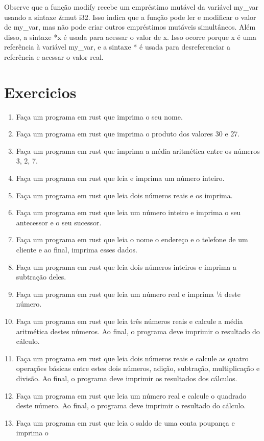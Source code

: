 \documentclass[12pt,a4paper,oneside]{abntex2}
\begin{document}
Observe que a função modify recebe um empréstimo mutável da variável my\_var usando a sintaxe \&mut i32. Isso indica que a função pode ler e modificar o valor de my\_var, mas não pode criar outros empréstimos mutáveis simultâneos. Além disso, a sintaxe *x é usada para acessar o valor de x. Isso ocorre porque x é uma referência à variável my\_var, e a sintaxe * é usada para desreferenciar a referência e acessar o valor real.

\section{Exercicios}
\begin{enumerate}
    \item Faça um programa em rust que imprima o seu nome.
    \item Faça um programa em rust que imprima o produto dos valores 30 e 27.
\item Faça um programa em rust que imprima a média aritmética entre os números 3, 2,
7.
\item Faça um programa em rust que leia e imprima um número inteiro.
\item Faça um programa em rust que leia dois números reais e os imprima.
\item Faça um programa em rust que leia um número inteiro e imprima o seu antecessor
e o seu sucessor.
\item Faça um programa em rust que leia o nome o endereço e o telefone de um cliente e
ao final, imprima esses dados.
\item Faça um programa em rust que leia dois números inteiros e imprima a subtração
deles.
\item Faça um programa em rust que leia um número real e imprima ¼ deste número.
\item Faça um programa em rust que leia três números reais e calcule a média aritmética
destes números. Ao final, o programa deve imprimir o resultado do cálculo.
\item Faça um programa em rust que leia dois números reais e calcule as quatro operações
básicas entre estes dois números, adição, subtração, multiplicação e divisão. Ao
final, o programa deve imprimir os resultados dos cálculos.
\item Faça um programa em rust que leia um número real e calcule o quadrado deste
número. Ao final, o programa deve imprimir o resultado do cálculo.
\item Faça um programa em rust que leia o saldo de uma conta poupança e imprima o

\end{enumerate}
\end{document}
